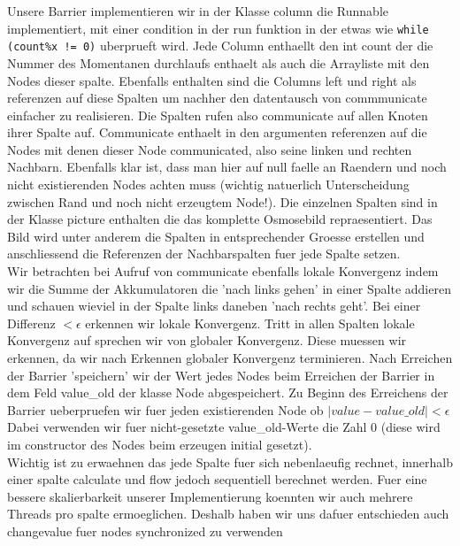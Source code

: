 \documentclass[12pt]{article}
\begin{document}
Unsere Barrier implementieren wir in der Klasse column die Runnable implementiert, mit einer condition in der run funktion in der etwas wie \verb+while (count%x != 0)+ uberprueft wird. Jede Column enthaellt den int count der die Nummer des Momentanen durchlaufs enthaelt als auch die Arrayliste mit den Nodes dieser spalte. Ebenfalls enthalten sind die Columns left und right als referenzen auf diese Spalten um nachher den datentausch von commmunicate einfacher zu realisieren. Die Spalten rufen also communicate auf allen Knoten ihrer Spalte auf. Communicate enthaelt in den argumenten referenzen auf die Nodes mit denen dieser Node communicated, also seine linken und rechten Nachbarn. Ebenfalls klar ist, dass man hier auf null faelle an Raendern und noch nicht existierenden Nodes achten muss (wichtig natuerlich Unterscheidung zwischen Rand und noch nicht erzeugtem Node!). Die einzelnen Spalten sind in der Klasse picture enthalten die das komplette Osmosebild repraesentiert. Das Bild wird unter anderem die Spalten in entsprechender Groesse erstellen und anschliessend die Referenzen der Nachbarspalten fuer jede Spalte setzen.\\
Wir betrachten bei Aufruf von communicate ebenfalls lokale Konvergenz indem wir die Summe der Akkumulatoren die 'nach links gehen' in einer Spalte addieren und schauen wieviel in der Spalte links daneben 'nach rechts geht'. Bei einer Differenz $< \epsilon$ erkennen wir lokale Konvergenz. Tritt in allen Spalten lokale Konvergenz auf sprechen wir von globaler Konvergenz. Diese muessen wir erkennen, da wir nach Erkennen globaler Konvergenz terminieren. Nach Erreichen der Barrier 'speichern' wir der Wert jedes Nodes beim Erreichen der Barrier in dem Feld value\_old der klasse Node abgespeichert. Zu Beginn des Erreichens der Barrier ueberpruefen wir fuer jeden existierenden Node ob $|value-value\_old| < \epsilon$ Dabei verwenden wir fuer nicht-gesetzte value\_old-Werte die Zahl 0 (diese wird im constructor des Nodes beim erzeugen initial gesetzt).\\
Wichtig ist zu erwaehnen das jede Spalte fuer sich nebenlaeufig rechnet, innerhalb einer spalte calculate und flow jedoch sequentiell berechnet werden. Fuer eine bessere skalierbarkeit unserer Implementierung koennten wir auch mehrere Threads pro spalte ermoeglichen. Deshalb haben wir uns dafuer entschieden auch changevalue fuer nodes synchronized zu verwenden\\





\end{document}
